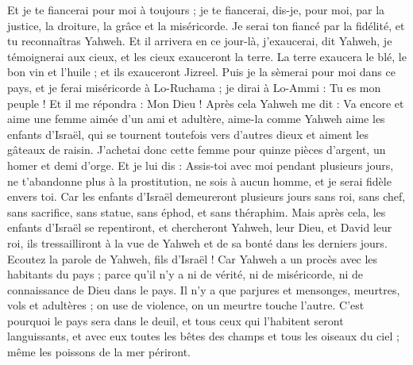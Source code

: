 \begin{multicols}{2}
Et je te fiancerai pour moi à toujours ; je te fiancerai, dis-je, pour moi, par la justice, la droiture, la grâce et la miséricorde.
Je serai ton fiancé par la fidélité, et tu reconnaîtras Yahweh.
Et il arrivera en ce jour-là, j’exaucerai, dit Yahweh, je témoignerai aux cieux, et les cieux exauceront la terre.
La terre exaucera le blé, le bon vin et l'huile ; et ils exauceront Jizreel.
Puis je la sèmerai pour moi dans ce pays, et je ferai miséricorde à Lo-Ruchama ; je dirai à Lo-Ammi : Tu es mon peuple ! Et il me répondra : Mon Dieu !
\VerseOne{}Après cela Yahweh me dit : Va encore et aime une femme aimée d'un ami et adultère, aime-la comme Yahweh aime les enfants d'Israël, qui se tournent toutefois vers d'autres dieux et aiment les gâteaux de raisin.
J’achetai donc cette femme pour quinze pièces d'argent, un homer et demi d'orge.
Et je lui dis : Assis-toi avec moi pendant plusieurs jours, ne t'abandonne plus à la prostitution, ne sois à aucun homme, et je serai fidèle envers toi.
Car les enfants d'Israël demeureront plusieurs jours sans roi, sans chef, sans sacrifice, sans statue, sans éphod, et sans théraphim.
Mais après cela, les enfants d'Israël se repentiront, et chercheront Yahweh, leur Dieu, et David leur roi, ils tressailliront à la vue de Yahweh et de sa bonté dans les derniers jours.
\VerseOne{}Ecoutez la parole de Yahweh, fils d'Israël ! Car Yahweh a un procès avec les habitants du pays ; parce qu'il n'y a ni de vérité, ni de miséricorde, ni de connaissance de Dieu dans le pays.
Il n'y a que parjures et mensonges, meurtres, vols et adultères ; on use de violence, on un meurtre touche l'autre.
C'est pourquoi le pays sera dans le deuil, et tous ceux qui l’habitent seront languissants, et avec eux toutes les bêtes des champs et tous les oiseaux du ciel ; même les poissons de la mer périront.

\end{multicols}
